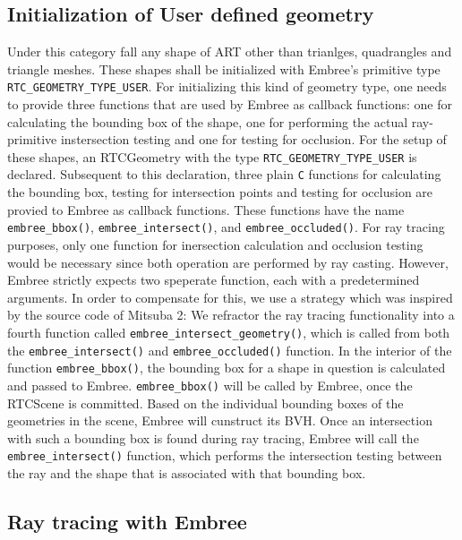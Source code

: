 \subsection{Initialization of User defined geometry}
Under this category fall any shape of ART other than trianlges, quadrangles and triangle meshes. These shapes shall be initialized with Embree's primitive type \texttt{RTC\_GEOMETRY\_TYPE\_USER}. For initializing this kind of geometry type, one needs to provide three functions that are used by Embree as callback functions: one for calculating the bounding box of the shape, one for performing the actual ray-primitive instersection testing and one for testing for occlusion. For the setup of these shapes, an RTCGeometry with the type \texttt{RTC\_GEOMETRY\_TYPE\_USER} is declared. Subsequent to this declaration, three plain \texttt{C} functions for calculating the bounding box, testing for intersection points and testing for occlusion are provied to Embree as callback functions.
These functions have the name \texttt{embree\_bbox()}, \texttt{embree\_intersect()}, and \texttt{embree\_occluded()}. For ray tracing purposes, only one function for inersection calculation and occlusion testing would be necessary since both operation are performed by ray casting. However, Embree strictly expects two speperate function, each with a predetermined arguments. In order to compensate for this, we use a strategy which was inspired by the source code of Mitsuba 2: We refractor the ray tracing functionality into a fourth function called \texttt{embree\_intersect\_geometry()}, which is called from both the \texttt{embree\_intersect()} and \texttt{embree\_occluded()} function. 
In the interior of the function \texttt{embree\_bbox()}, the bounding box for a shape in question is calculated and passed to Embree. \texttt{embree\_bbox()} will be called by Embree, once the RTCScene is committed. Based on the individual bounding boxes of the geometries in the scene, Embree will cunstruct its BVH. Once an intersection with such a bounding box is found during ray tracing, Embree will call the \texttt{embree\_intersect()} function, which performs the intersection testing between the ray and the shape that is associated with that bounding box.



\subsection{Ray tracing with Embree}
\label{sec:embree_raycasting}

